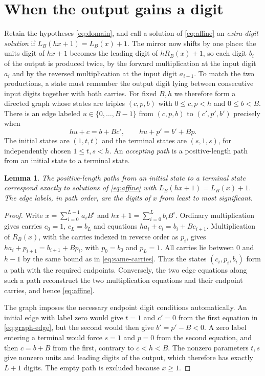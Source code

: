 \documentclass[11pt]{amsart}
\newtheorem{lemma}[theorem]{Lemma}
\theoremstyle{remark}\newtheorem{remark}[theorem]{Remark}
\newcommand{\rev}{R}
\begin{document}
\section{When the output gains a digit}\label{sec:extra}\label{sec:noncoprime}

Retain the hypotheses \eqref{eq:domain}, and call a solution of \eqref{eq:affine} an \emph{extra-digit solution} if $L_B(hx+1)=L_B(x)+1$.
The mirror now shifts by one place: the units digit of $hx+1$ becomes the leading digit of $hR_B(x)+1$, so each digit $b_i$ of the output is produced twice, by the forward multiplication at the input digit $a_i$ and by the reversed multiplication at the input digit $a_{i-1}$.
To match the two productions, a state must remember the output digit lying between consecutive input digits together with both carries.
For fixed $B,h$ we therefore form a directed graph whose states are triples $(c,p,b)$ with $0\le c,p<h$ and $0\le b<B$.
There is an edge labeled $u\in\{0,\ldots,B-1\}$ from $(c,p,b)$ to $(c',p',b')$ precisely when
\begin{equation}\label{eq:graph-edge}
 hu+c=b+Bc',\qquad hu+p'=b'+Bp.
\end{equation}
The initial states are $(1,t,t)$ and the terminal states are $(s,1,s)$, for independently chosen $1\le t,s<h$. An \emph{accepting path} is a positive-length path from an initial state to a terminal state.

\begin{lemma}\label{lem:carry-graph}
The positive-length paths from an initial state to a terminal state correspond exactly to solutions of \eqref{eq:affine} with $L_B(hx+1)=L_B(x)+1$.
The edge labels, in path order, are the digits of $x$ from least to most significant.
\end{lemma}
\begin{proof}
Write $x=\sum_{i=0}^{L-1}a_iB^i$ and $hx+1=\sum_{i=0}^{L}b_iB^i$.
Ordinary multiplication gives carries $c_0=1$, $c_L=b_L$ and equations
$ha_i+c_i=b_i+Bc_{i+1}$.
Multiplication of $\rev_B(x)$, with the carries indexed in reverse order as $p_i$, gives
$ha_i+p_{i+1}=b_{i+1}+Bp_i$, with $p_0=b_0$ and $p_L=1$.
All carries lie between 0 and $h-1$ by the same bound as in \eqref{eq:same-carries}.
Thus the states $(c_i,p_i,b_i)$ form a path with the required endpoints.
Conversely, the two edge equations along such a path reconstruct the two multiplication equations and their endpoint carries, and hence \eqref{eq:affine}.

The graph imposes the necessary endpoint digit conditions automatically.
An initial edge with label zero would give $t=1$ and $c'=0$ from the first equation in \eqref{eq:graph-edge}, but the second would then give $b'=p'-B<0$.
A zero label entering a terminal would force $s=1$ and $p=0$ from the second equation, and then $c=b+B$ from the first, contrary to $c<h<B$.
The nonzero parameters $t,s$ give nonzero units and leading digits of the output, which therefore has exactly $L+1$ digits.
The empty path is excluded because $x\ge1$.
\end{proof}
\end{document}
